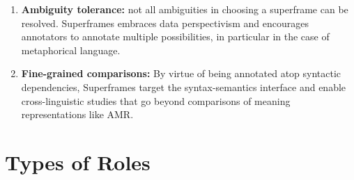 \documentclass[a4paper]{article}
\begin{document}
\begin{enumerate}
    \item \textbf{Ambiguity tolerance:} not all ambiguities in choosing a superframe can be resolved. Superframes embraces data perspectivism \citep{basile-2020-end} and encourages annotators to annotate multiple possibilities, in particular in the case of metaphorical language.
    \item \textbf{Fine-grained comparisons:} By virtue of being annotated atop syntactic dependencies, Superframes target the syntax-semantics interface and enable cross-linguistic studies that go beyond comparisons of meaning representations like AMR.
\end{enumerate}

\clearpage
\section{Types of Roles}
\end{document}
